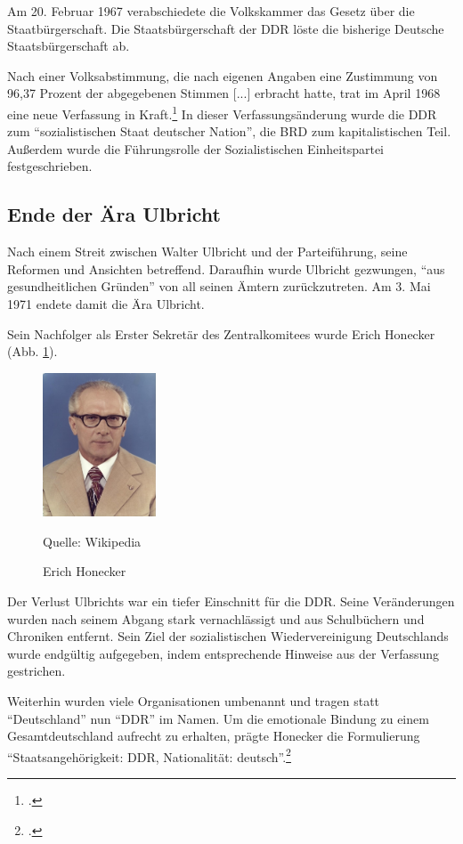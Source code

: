\documentclass[12pt,a4paper]{article}
\begin{document}
Am 20. Februar 1967 verabschiedete die Volkskammer das Gesetz über die Staatbürgerschaft. Die Staatsbürgerschaft der DDR löste die bisherige Deutsche Staatsbürgerschaft ab.

Nach einer Volksabstimmung, die nach eigenen Angaben eine Zustimmung von 96,37 Prozent der abgegebenen Stimmen [...] erbracht hatte, trat im April 1968 eine neue Verfassung in Kraft.\footcite[wörtl. aus][]{izpb:reform}
In dieser Verfassungsänderung wurde die DDR zum \enquote{sozialistischen Staat deutscher Nation}, die BRD zum kapitalistischen Teil. Außerdem wurde die Führungsrolle der Sozialistischen Einheitspartei festgeschrieben.


\subsection{Ende der Ära Ulbricht}
\label{ende-ulbricht}

Nach einem Streit zwischen Walter Ulbricht und der Parteiführung, seine Reformen und Ansichten betreffend. Daraufhin wurde Ulbricht gezwungen, \enquote{aus gesundheitlichen Gründen} von all seinen Ämtern zurückzutreten. Am 3. Mai 1971 endete damit die Ära Ulbricht.

Sein Nachfolger als Erster Sekretär des Zentralkomitees wurde Erich Honecker (Abb. \ref{img:honecker}). 

\begin{figure}[hh]
    \centering
    \includegraphics[width=0.3\textwidth]{Bilder/Erich_Honecker.jpg}
    \caption{Erich Honecker}
    Quelle: Wikipedia
    \label{img:honecker}
\end{figure}

Der Verlust Ulbrichts war ein tiefer Einschnitt für die DDR. Seine Veränderungen wurden nach seinem Abgang stark vernachlässigt und aus Schulbüchern und Chroniken entfernt. Sein Ziel der sozialistischen Wiedervereinigung Deutschlands wurde endgültig aufgegeben, indem entsprechende Hinweise aus der Verfassung gestrichen.

Weiterhin wurden viele Organisationen umbenannt und tragen statt \enquote{Deutschland} nun \enquote{DDR} im Namen. Um die emotionale Bindung zu einem Gesamtdeutschland aufrecht zu erhalten, prägte Honecker die Formulierung \enquote{Staatsangehörigkeit: DDR, Nationalität: deutsch}.\footcite{wiki:geschddr}
\end{document}
